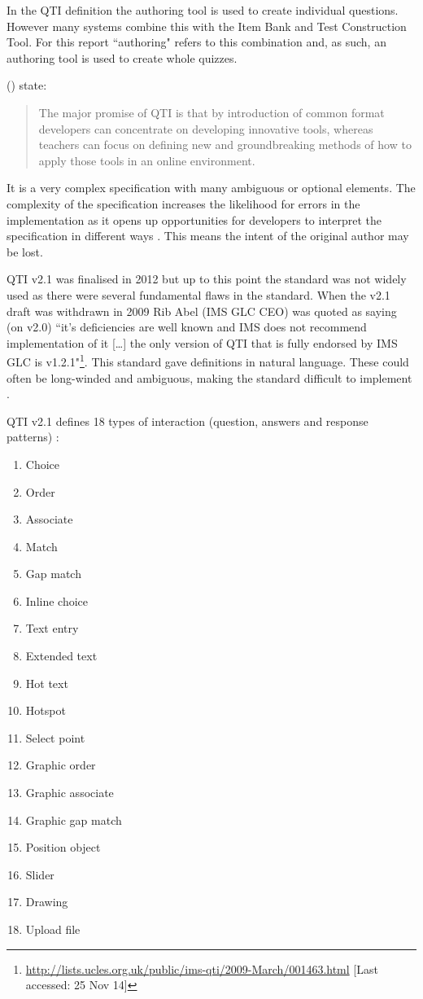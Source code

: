 In the \gls{QTI} definition the authoring tool is used to create individual questions. However many systems combine this with the Item Bank and Test Construction Tool. For this report ``\gls{authoring}" refers to this combination and, as such, an authoring tool is used to create whole quizzes.

 (\citeyear{wikieassessment}) state:
\begin{quote}
The major promise of QTI is that by introduction of common format developers can concentrate on developing innovative tools, whereas teachers can focus on defining new and groundbreaking methods of how to apply those tools in an online environment.
\end{quote}

It is a very complex specification with many ambiguous or optional elements. The complexity of the specification increases the likelihood for errors in the implementation as it opens up opportunities for developers to interpret the specification in different ways \citep{failQTI}. This means the intent of the original author may be lost.

\gls{QTI} v2.1 was finalised in 2012 \citep{qtiOverview} but up to this point the standard was not widely used \citep{eps265979} as there were several fundamental flaws in the standard. When the v2.1 draft was withdrawn in 2009 Rib Abel (IMS GLC CEO) was quoted as saying (on v2.0) ``it’s deficiencies are well known and IMS does not recommend implementation of it [\dots] the only version of QTI that is fully endorsed by IMS GLC is v1.2.1"\footnote{\url{http://lists.ucles.org.uk/public/ims-qti/2009-March/001463.html} [Last accessed: 25 Nov 14]}. This standard gave definitions in natural language. These could often be long-winded and ambiguous, making the standard difficult to implement \citep{failQTI, Sclater2007}.

\gls{QTI} v2.1 defines 18 types of interaction (question, answers and response patterns) \citep{qtiImplementation}:
\begin{multicols}{3}
\begin{enumerate}
\item Choice
\item Order
\item Associate
\item Match
\item Gap match
\item Inline choice
\item Text entry
\item Extended text
\item Hot text
\item Hotspot
\item Select point
\item Graphic order
\item Graphic associate
\item Graphic gap match
\item Position object
\item Slider
\item Drawing
\item Upload file
\end{enumerate}
\end{multicols}

